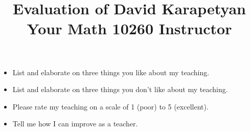 \documentclass[12pt]{article}
\begin{document}
\title{ \large{
Evaluation of David Karapetyan \\
Your Math 10260 Instructor \\
}}
\author{}
\date{}
\maketitle
\thispagestyle{empty}
\begin{itemize}

	\item List and elaborate on three things you like about my teaching.
		\vspace{4cm}

	\item List and elaborate on three things you don't like about my teaching.
		\vspace{4cm}

	\item Please rate my teaching on a scale of 1 (poor) to 5 (excellent).
		\vspace{4cm}


	\item Tell me how I can improve as a teacher. 
\end{itemize}
\end{document}
